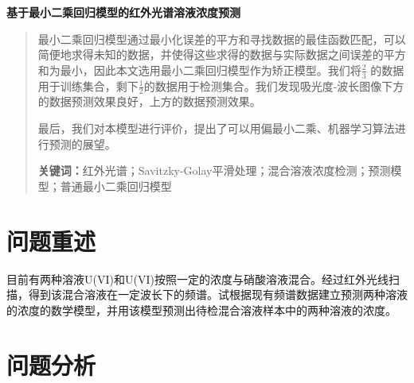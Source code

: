 \documentclass[UTF8]{ctexart}
\begin{document}
\begin{titlepage}%
\begin{center}
\heiti{}\textbf{基于最小二乘回归模型的红外光谱溶液浓度预测} %
\vspace{2ex}
\end{center}

\begin{abstract}
最小二乘回归模型通过最小化误差的平方和寻找数据的最佳函数匹配，可以简便地求得未知的数据，并使得这些求得的数据与实际数据之间误差的平方和为最小，因此本文选用最小二乘回归模型作为矫正模型。我们将$\frac{2}{3}$ 的数据用于训练集合，剩下$\frac{1}{2}$的数据用于检测集合。我们发现吸光度-波长图像下方的数据预测效果良好，上方的数据预测效果。\par
最后，我们对本模型进行评价，提出了可以用偏最小二乘、机器学习算法进行预测的展望。\par
\textbf{关键词：}红外光谱；Savitzky-Golay平滑处理；混合溶液浓度检测；预测模型；普通最小二乘回归模型
\end{abstract}
\end{titlepage}

\pagestyle{fancy}
\lhead{}
\chead{}
\rhead{}
\renewcommand{\headrulewidth}{0pt}
\renewcommand{\footrulewidth}{0.4pt} %

\newpage
\section{问题重述}
目前有两种溶液U(VI)和U(VI)按照一定的浓度与硝酸溶液混合。经过红外光线扫描，得到该混合溶液在一定波长下的频谱。试根据现有频谱数据建立预测两种溶液的浓度的数学模型，并用该模型预测出待检混合溶液样本中的两种溶液的浓度。\par

\section{问题分析}
\end{document}

